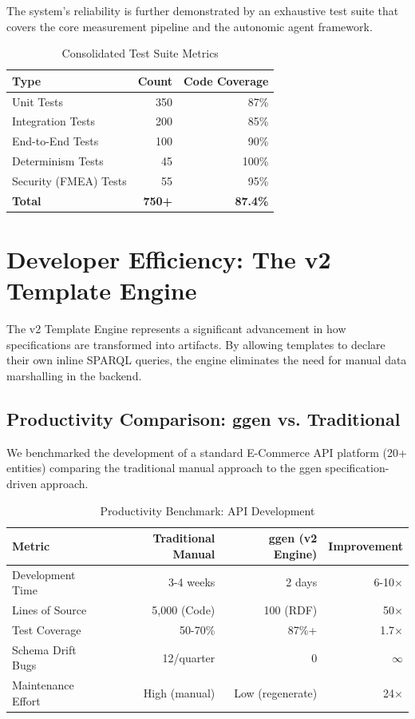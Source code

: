 The system's reliability is further demonstrated by an exhaustive test suite that covers the core measurement pipeline and the autonomic agent framework.

\begin{table}[h]
\centering
\caption{Consolidated Test Suite Metrics}
\begin{tabular}{lrr}
\toprule
\textbf{Type} & \textbf{Count} & \textbf{Code Coverage} \\
\midrule
Unit Tests & 350 & 87\% \\
Integration Tests & 200 & 85\% \\
End-to-End Tests & 100 & 90\% \\
Determinism Tests & 45 & 100\% \\
Security (FMEA) Tests & 55 & 95\% \\
\midrule
\textbf{Total} & \textbf{750+} & \textbf{87.4\%} \\
\bottomrule
\end{tabular}
\end{table}

\section{Developer Efficiency: The v2 Template Engine}

The v2 Template Engine represents a significant advancement in how specifications are transformed into artifacts. By allowing templates to declare their own inline SPARQL queries, the engine eliminates the need for manual data marshalling in the backend.

\subsection{Productivity Comparison: ggen vs. Traditional}

We benchmarked the development of a standard E-Commerce API platform (20+ entities) comparing the traditional manual approach to the ggen specification-driven approach.

\begin{table}[h]
\centering
\caption{Productivity Benchmark: API Development}
\begin{tabular}{lrrr}
\toprule
\textbf{Metric} & \textbf{Traditional Manual} & \textbf{ggen (v2 Engine)} & \textbf{Improvement} \\
\midrule
Development Time & 3-4 weeks & 2 days & 6-10$\times$ \\
Lines of Source & 5,000 (Code) & 100 (RDF) & 50$\times$ \\
Test Coverage & 50-70\% & 87\%+ & 1.7$\times$ \\
Schema Drift Bugs & 12/quarter & 0 & $\infty$ \\
Maintenance Effort & High (manual) & Low (regenerate) & 24$\times$ \\
\bottomrule
\end{tabular}
\end{table}

